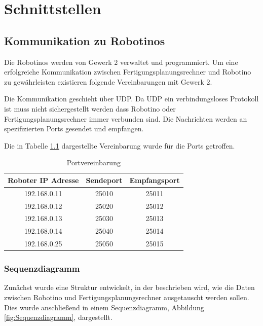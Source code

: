 
\chapter{Schnittstellen}
\label{sec:Schnittstellen}


\section{Kommunikation zu Robotinos}
\label{sec:Gewerk2Protokoll}

Die Robotinos werden von Gewerk 2 verwaltet und programmiert. Um eine erfolgreiche Kommunikation zwischen Fertigungsplanungsrechner und Robotino zu gewährleisten existieren folgende Vereinbarungen mit Gewerk 2.

Die Kommunikation geschieht über UDP. Da UDP ein verbindungsloses Protokoll ist muss nicht sichergestellt werden dass Robotino oder Fertigungsplanungsrechner immer verbunden sind. Die Nachrichten werden an spezifizierten Ports gesendet und empfangen.

Die in Tabelle \ref{tab:Ports} dargestellte Vereinbarung wurde für die Ports getroffen.

\begin{table}[!ht]
	\centering
	\begin{tabular}{|c|c|c|}
		\hline
		Roboter IP Adresse & Sendeport &	Empfangsport \\
		\hline
		192.168.0.11 & 25010 & 25011 \\
    192.168.0.12 & 25020 & 25012 \\
    192.168.0.13 & 25030 & 25013 \\
    192.168.0.14 & 25040 & 25014 \\
    192.168.0.25 & 25050 & 25015 \\
		\hline
	\end{tabular}
	\caption{Portvereinbarung}
	\label{tab:Ports}
\end{table}

\subsection{Sequenzdiagramm}
\label{sec:sequenzdiagram}

Zunächst wurde eine Struktur entwickelt, in der beschrieben wird, wie die Daten zwischen Robotino und Fertigungsplanungsrechner ausgetauscht werden sollen. Dies wurde anschließend in einem Sequenzdiagramm, Abbildung \ref{fig:Sequenzdiagramm}, dargestellt. 

